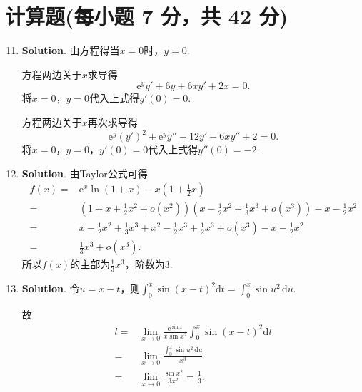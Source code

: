 \documentclass[../main.tex]{subfiles}
\begin{document}
\section{计算题(每小题 7 分，共 42 分)}
\begin{enumerate}
    \setcounter{enumi}{10}
    \item \textbf{Solution}. 由方程得当$x=0$时，$y=0$.

          方程两边关于$x$求导得
          \[
              \mathrm{e}^{y}y'+6y+6xy'+2x=0.
          \]
          将$x=0$，$y=0$代入上式得$y'(0)=0$.

          方程两边关于$x$再次求导得
          \[
              \mathrm{e}^{y}(y')^{2}+\mathrm{e}^{y}y''+12y'+6xy''+2=0.
          \]
          将$x=0$，$y=0$，$y'(0)=0$代入上式得$y''(0)=-2$.

    \item \textbf{Solution}. 由Taylor公式可得
          \[
              \begin{aligned}
                  f(x)= {} & \mathrm{e}^{x}\ln(1+x)-x\left(1+\frac{1}{2}x\right)                                                                    \\
                  = {}     & \left(1+x+\frac{1}{2}x^{2}+o(x^{2})\right)\left(x-\frac{1}{2}x^{2}+\frac{1}{3}x^{3}+o(x^{3})\right)-x-\frac{1}{2}x^{2} \\
                  = {}     & x-\frac{1}{2}x^{2}+\frac{1}{3}x^{3}+x^{2}-\frac{1}{2}x^{3}+\frac{1}{2}x^{3}+o(x^{3})-x-\frac{1}{2}x^{2}                \\
                  = {}     & \frac{1}{3}x^{3}+o(x^{3}).
              \end{aligned}
          \]
          所以$f(x)$的主部为$\frac{1}{3}x^{3}$，阶数为$3$.

    \item \textbf{Solution}. 令$u=x-t$，则$\int_{0}^{x}\sin(x-t)^{2} \mathrm{d}
              t = \int_{0}^{x}\sin u^{2}\,\mathrm{d}u$.

          故
          \[
              \begin{aligned}
                  l = {} & \lim_{x\to0}\frac{\mathrm{e}^{\sin x}}{x\sin x^2}\int_{0}^{x}\sin(x-t)^{2} \mathrm{d}t \\
                  = {}   & \lim_{x\to0}\frac{\displaystyle\int_{0}^{x}\sin u^2\,\mathrm{d}u}{x^3}                 \\
                  = {}   & \lim_{x\to0}\frac{\sin x^2}{3x^2}= \frac{1}{3}.
              \end{aligned}
          \]


\end{enumerate}
\end{document}

